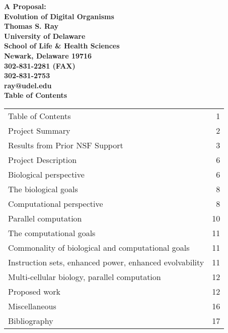 \begin{center}
\Large \bf A Proposal:\rm \\
\Large \bf Evolution of Digital Organisms\rm \vspace{1cm}\\
\large \bf Thomas S. Ray\rm \\
\large \bf University of Delaware\rm \\
\large \bf School of Life \& Health Sciences\rm \\
\large \bf Newark, Delaware  19716\rm \\
\large \bf 302-831-2281 (FAX)\rm \\
\large \bf 302-831-2753\rm \\
\large \bf ray@udel.edu\rm \normalsize\vspace{1.5cm}\\
\large \bf Table of Contents\rm \normalsize\vspace{1cm}\\
\begin{tabular}{lr}

Table of Contents & 1\\
Project Summary & 2\\
Results from Prior NSF Support & 3\\
Project Description & 6\\
\hspace{1cm} Biological perspective & 6\\
\hspace{2cm} The biological goals & 8\\
\hspace{1cm} Computational perspective & 8\\
\hspace{2cm} Parallel computation & 10\\
\hspace{2cm} The computational goals & 11\\
\hspace{1cm} Commonality of biological and computational goals & 11\\
\hspace{2cm} Instruction sets, enhanced power, enhanced evolvability & 11\\
\hspace{2cm} Multi-cellular biology, parallel computation & 12\\
\hspace{1cm} Proposed work & 12\\
\hspace{1cm} Miscellaneous & 16\\
Bibliography & 17\\
\end{tabular}
\end{center}


